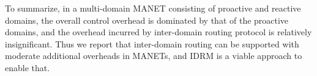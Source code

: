 To summarize, in a multi-domain MANET consisting of proactive and reactive domains, the overall control overhead is dominated by that of the proactive domains, and the overhead incurred by inter-domain routing protocol is relatively insignificant. Thus we report that inter-domain routing can be supported with moderate additional overheads in MANETs, and IDRM is a viable approach to enable that.







